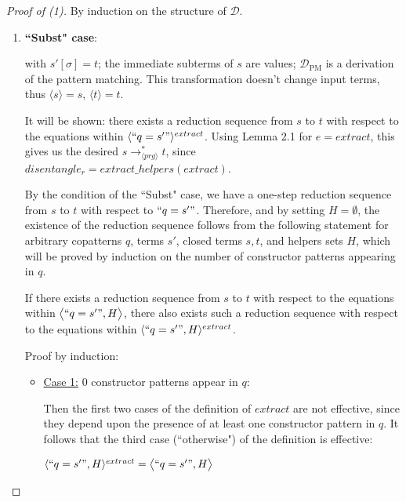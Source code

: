 \documentclass[11pt]{article} %
\begin{document}
\begin{proof}[Proof of (1)] By induction on the structure of $\mathcal{D}$.

\begin{enumerate}
\item \textbf{``Subst" case}:

\begin{prooftree}
\end{prooftree}

with $s'[\sigma] = t$; the immediate subterms of $s$ are values; $\mathcal{D}_{\textrm{PM}}$ is a derivation of the pattern matching. This transformation doesn't change input terms, thus $\langle s \rangle = s$, $\langle t \rangle = t$.

It will be shown: there exists a reduction sequence from $s$ to $t$ with respect to the equations within $\langle `` q = s' " \rangle^{extract}$. Using Lemma 2.1 for $e = extract$, this gives us the desired $s \longrightarrow_{\langle prg \rangle}^* t$, since $disentangle_r = extract\_helpers(extract)$.

By the condition of the ``Subst" case, we have a one-step reduction sequence from $s$ to $t$ with respect to $`` q = s' "$. Therefore, and by setting $H = \emptyset$, the existence of the reduction sequence follows from the following statement for arbitrary copatterns $q$, terms $s'$, closed terms $s,t$, and helpers sets $H$, which will be proved by induction on the number of constructor patterns appearing in $q$.

If there exists a reduction sequence from $s$ to $t$ with respect to the equations within $\big\langle `` q = s' ", H \big\rangle$, there also exists such a reduction sequence with respect to the equations within $\langle `` q = s' ", H \rangle^{extract}$.

Proof by induction:

\begin{itemize}

\item \underline{Case 1:} 0 constructor patterns appear in $q$:

Then the first two cases of the definition of $extract$ are not effective, since they depend upon the presence of at least one constructor pattern in $q$. It follows that the third case (``otherwise") of the definition is effective:

$\langle `` q = s' ", H \rangle^{extract} = \big\langle `` q = s' ", H \big\rangle$


\end{itemize}
\end{enumerate}
\end{proof}
\end{document}
